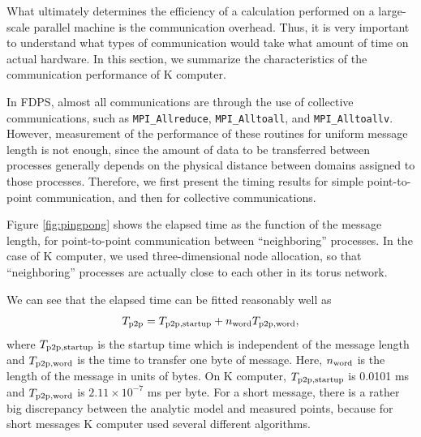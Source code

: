 What ultimately determines the efficiency of a calculation performed
on a large-scale parallel machine is the communication overhead. Thus,
it is very important to understand what types of communication would
take what amount of time on actual hardware. In this section, we
summarize the characteristics of the communication performance of K
computer.

In FDPS, almost all communications are through the use of collective
communications, such as {\tt MPI\_Allreduce}, {\tt MPI\_Alltoall}, and
{\tt MPI\_Alltoallv}. However, measurement of the performance of these
routines for uniform message length is not enough, since the amount of
data to be transferred between processes generally depends on the
physical distance between domains assigned to those
processes. Therefore, we first present the timing results for simple
point-to-point communication, and then for collective communications.

Figure \ref{fig:pingpong} shows the elapsed time as the function of
the message length, for point-to-point communication between
``neighboring'' processes. In the case of K computer, we used
three-dimensional node allocation, so that ``neighboring'' processes
are actually close to each other in its torus network.


We can see that the elapsed time can be fitted reasonably well as
\begin{equation}
\label{eq:Tp2p}
  T_{\rm p2p} = T_{\rm p2p,startup} + n_{\rm word}T_{\rm p2p,word},
\end{equation}
where $T_{\rm p2p,startup}$ is the startup time which is independent
of the message length and $T_{\rm p2p,word}$ is the time to transfer
one byte of message. Here, $n_{\rm word}$ is the length of the message
in units of bytes. On K computer, $T_{\rm p2p,startup}$ is 0.0101 ms
and $T_{\rm p2p,word}$ is $2.11 \times 10^{-7}$ ms per byte. For a
short message, there is a rather big discrepancy between the analytic
model and measured points, because for short messages K computer used
several different algorithms.



